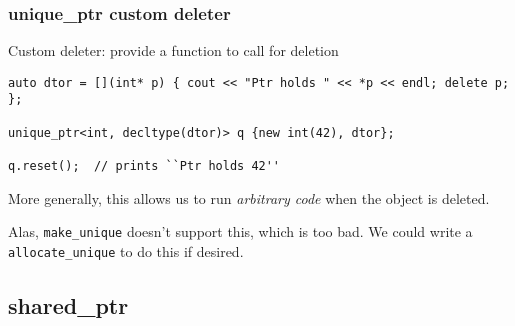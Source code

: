 




\begin{frame}[fragile]
\frametitle{unique\_ptr custom deleter}
Custom deleter: provide a function to call for deletion
{\scriptsize\begin{verbatim}
auto dtor = [](int* p) { cout << "Ptr holds " << *p << endl; delete p; };

unique_ptr<int, decltype(dtor)> q {new int(42), dtor};

q.reset();  // prints ``Ptr holds 42''
\end{verbatim}}


\vskip 12pt

More generally, this allows us to run \emph{arbitrary code} when the
object is deleted.

\vskip 6pt
Alas, \texttt{make\_unique} doesn't support this, which is too bad.  We could write a \texttt{allocate\_unique} to do this if desired.

\end{frame}



\subsection{shared\_ptr}


